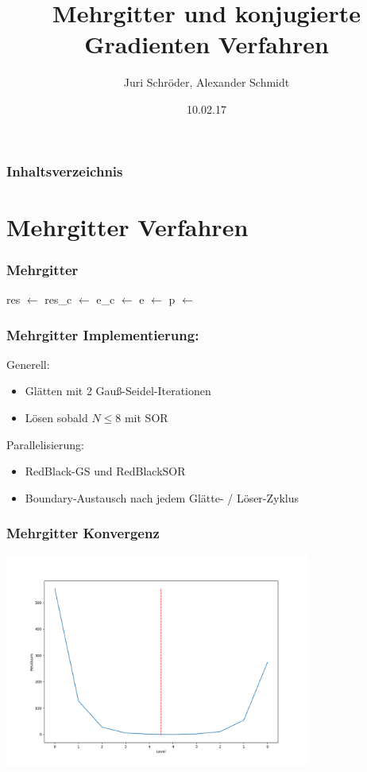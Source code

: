 \documentclass[]{beamer}
\title{Mehrgitter und konjugierte Gradienten Verfahren}
\author{Juri Schröder, Alexander Schmidt}
\date{10.02.17}
\begin{document}
\begin{frame}
\titlepage
\end{frame}

\begin{frame}
\frametitle{Inhaltsverzeichnis}
\tableofcontents
\end{frame}


\section{Mehrgitter Verfahren}
\begin{frame}
  \frametitle{Mehrgitter}
  \begin{algorithmic}
    \State {}
    \State {}
    \Else
    \State res $\gets$ 
    \State res\_c $\gets$ 
    \State e\_c $\gets$ 
    \State e $\gets$ 
    \State p $\gets$ 
    \State {}
    \EndIf
    \EndFunction
  \end{algorithmic}
\end{frame}

\begin{frame}
  \frametitle{Mehrgitter Implementierung:}
  Generell:
  \begin{itemize}
    \item Glätten mit 2 Gauß-Seidel-Iterationen
    \item Lösen sobald $N \leq 8$ mit SOR
  \end{itemize}
  Parallelisierung:
  \begin{itemize}
    \item RedBlack-GS und RedBlackSOR
    \item Boundary-Austausch nach jedem Glätte- / Löser-Zyklus
  \end{itemize}
\end{frame}

\begin{frame}
  \frametitle{Mehrgitter Konvergenz}
  \begin{center}
    \includegraphics[width=0.9\linewidth, height=7cm]{MG_res_by_level.png}
  \end{center}
\end{frame}
\end{document}
